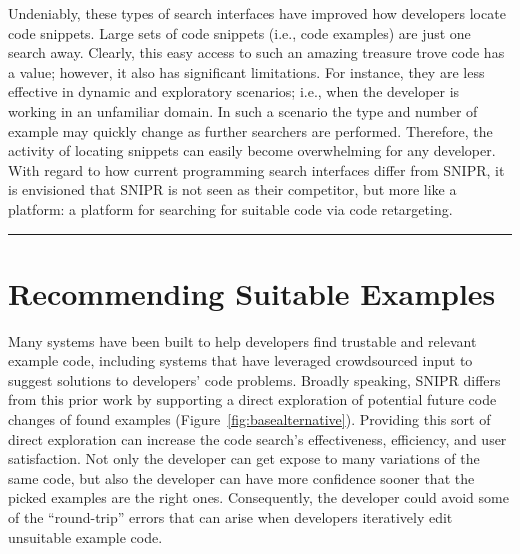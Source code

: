 Undeniably, these types of search interfaces have improved how developers locate code snippets. Large sets of code snippets (i.e., code examples) are just one search away. Clearly, this easy access to such an amazing treasure trove code has a value; however, it also has significant limitations. For instance, they are less effective in dynamic and exploratory scenarios; i.e., when the developer is working in an unfamiliar domain. In such a scenario the type and number of example may quickly change as further searchers are performed. Therefore, the activity of locating snippets can easily become overwhelming for any developer. With regard to how current programming search interfaces differ from \uppercase{SnipR}, it is envisioned that \uppercase{SnipR} is not seen as their competitor, but more like a platform: a platform for searching for suitable code via code retargeting.
% 
% 
 
\fancybreak{\pfbreakdisplay}

\section{Recommending Suitable Examples}
\label{sec:codesearch}

Many systems have been built to help developers find trustable and relevant example code, including systems that have leveraged crowdsourced input to suggest solutions to developers' code problems. Broadly speaking, \uppercase{SnipR} differs from this prior work by supporting a direct exploration of potential future code changes of found examples (Figure~\ref{fig:basealternative}). Providing this sort of direct exploration can increase the code search's effectiveness, efficiency, and user satisfaction. Not only the developer can get expose to many variations of the same code, but also the developer can have more confidence sooner that the picked examples are the right ones. Consequently, the developer could avoid some of the ``round-trip'' errors that can arise when developers iteratively edit unsuitable example code.

